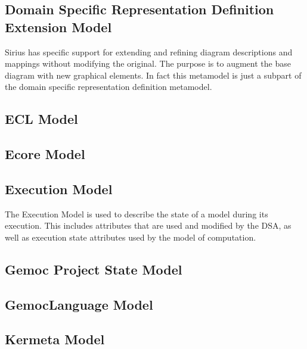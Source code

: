 \documentclass{gemoc} %
\begin{document}

\subsection{Domain Specific Representation Definition Extension Model}
Sirius has specific support for extending and refining diagram descriptions and mappings without modifying the original. The purpose is to augment the base diagram with new graphical elements. In fact this metamodel is just a subpart of the domain specific representation definition metamodel.

\subsection{ECL Model}


\subsection{Ecore Model}


\subsection{Execution Model}
The Execution Model is used to describe the state of a model during its execution. This includes attributes that are used and modified by the DSA, as well as execution state attributes used by the model of computation.

\subsection{Gemoc Project State Model}


\subsection{GemocLanguage Model}


\subsection{Kermeta Model}
\end{document}
